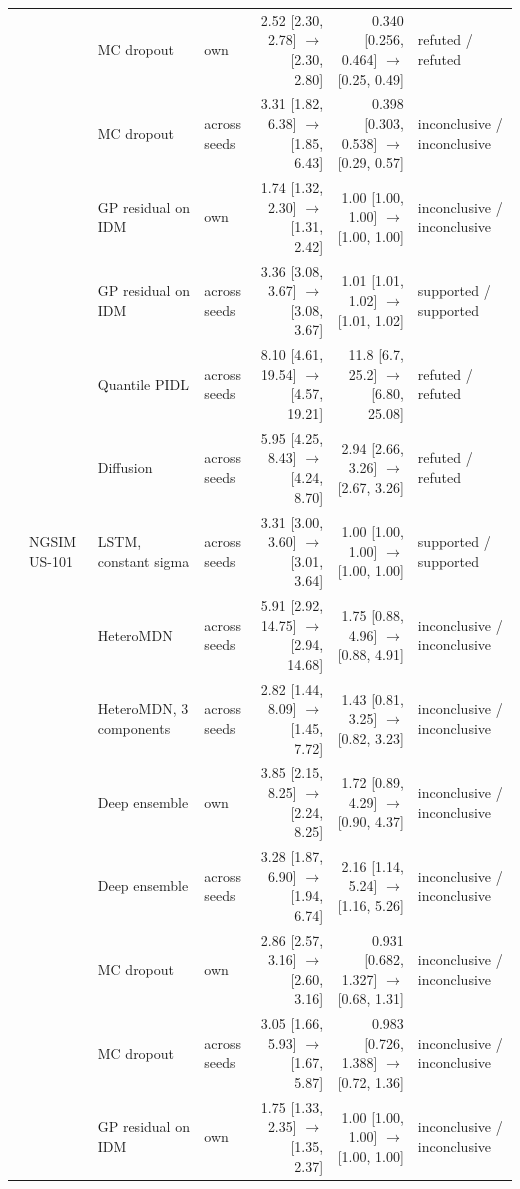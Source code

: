 \begin{longtable}{llllrrl}
 &  & MC dropout & own & 2.52 [2.30, 2.78] $\rightarrow$ [2.30, 2.80] & 0.340 [0.256, 0.464] $\rightarrow$ [0.25, 0.49] & refuted / refuted \\
 &  & MC dropout & across seeds & 3.31 [1.82, 6.38] $\rightarrow$ [1.85, 6.43] & 0.398 [0.303, 0.538] $\rightarrow$ [0.29, 0.57] & inconclusive / inconclusive \\
 &  & GP residual on IDM & own & 1.74 [1.32, 2.30] $\rightarrow$ [1.31, 2.42] & 1.00 [1.00, 1.00] $\rightarrow$ [1.00, 1.00] & inconclusive / inconclusive \\
 &  & GP residual on IDM & across seeds & 3.36 [3.08, 3.67] $\rightarrow$ [3.08, 3.67] & 1.01 [1.01, 1.02] $\rightarrow$ [1.01, 1.02] & supported / supported \\
 &  & Quantile PIDL & across seeds & 8.10 [4.61, 19.54] $\rightarrow$ [4.57, 19.21] & 11.8 [6.7, 25.2] $\rightarrow$ [6.80, 25.08] & refuted / refuted \\
 &  & Diffusion & across seeds & 5.95 [4.25, 8.43] $\rightarrow$ [4.24, 8.70] & 2.94 [2.66, 3.26] $\rightarrow$ [2.67, 3.26] & refuted / refuted \\
\midrule
 & NGSIM US-101 & LSTM, constant sigma & across seeds & 3.31 [3.00, 3.60] $\rightarrow$ [3.01, 3.64] & 1.00 [1.00, 1.00] $\rightarrow$ [1.00, 1.00] & supported / supported \\
 &  & HeteroMDN & across seeds & 5.91 [2.92, 14.75] $\rightarrow$ [2.94, 14.68] & 1.75 [0.88, 4.96] $\rightarrow$ [0.88, 4.91] & inconclusive / inconclusive \\
 &  & HeteroMDN, 3 components & across seeds & 2.82 [1.44, 8.09] $\rightarrow$ [1.45, 7.72] & 1.43 [0.81, 3.25] $\rightarrow$ [0.82, 3.23] & inconclusive / inconclusive \\
 &  & Deep ensemble & own & 3.85 [2.15, 8.25] $\rightarrow$ [2.24, 8.25] & 1.72 [0.89, 4.29] $\rightarrow$ [0.90, 4.37] & inconclusive / inconclusive \\
 &  & Deep ensemble & across seeds & 3.28 [1.87, 6.90] $\rightarrow$ [1.94, 6.74] & 2.16 [1.14, 5.24] $\rightarrow$ [1.16, 5.26] & inconclusive / inconclusive \\
 &  & MC dropout & own & 2.86 [2.57, 3.16] $\rightarrow$ [2.60, 3.16] & 0.931 [0.682, 1.327] $\rightarrow$ [0.68, 1.31] & inconclusive / inconclusive \\
 &  & MC dropout & across seeds & 3.05 [1.66, 5.93] $\rightarrow$ [1.67, 5.87] & 0.983 [0.726, 1.388] $\rightarrow$ [0.72, 1.36] & inconclusive / inconclusive \\
 &  & GP residual on IDM & own & 1.75 [1.33, 2.35] $\rightarrow$ [1.35, 2.37] & 1.00 [1.00, 1.00] $\rightarrow$ [1.00, 1.00] & inconclusive / inconclusive \\

\end{longtable}
